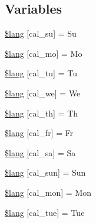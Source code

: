 \subsection*{Variables}
\begin{DoxyCompactItemize}
\item 
\mbox{\hyperlink{calendar__lang_8php_a2658243eff69e113a0e04a5b99e460c5}{\$lang}} \mbox{[}\textquotesingle{}cal\+\_\+su\textquotesingle{}\mbox{]} = \textquotesingle{}Su\textquotesingle{}
\item 
\mbox{\hyperlink{calendar__lang_8php_a1f9e709a44afce9a57157e6690fea106}{\$lang}} \mbox{[}\textquotesingle{}cal\+\_\+mo\textquotesingle{}\mbox{]} = \textquotesingle{}Mo\textquotesingle{}
\item 
\mbox{\hyperlink{calendar__lang_8php_a5c6f65fa28ce0cfba854143b7d6791a6}{\$lang}} \mbox{[}\textquotesingle{}cal\+\_\+tu\textquotesingle{}\mbox{]} = \textquotesingle{}Tu\textquotesingle{}
\item 
\mbox{\hyperlink{calendar__lang_8php_a665558e7ced8856da101496aae070447}{\$lang}} \mbox{[}\textquotesingle{}cal\+\_\+we\textquotesingle{}\mbox{]} = \textquotesingle{}We\textquotesingle{}
\item 
\mbox{\hyperlink{calendar__lang_8php_ae0e6a6298990150a03c6b6ac865c0b8e}{\$lang}} \mbox{[}\textquotesingle{}cal\+\_\+th\textquotesingle{}\mbox{]} = \textquotesingle{}Th\textquotesingle{}
\item 
\mbox{\hyperlink{calendar__lang_8php_a768a3d350ee6be1c25bf941e59875d7e}{\$lang}} \mbox{[}\textquotesingle{}cal\+\_\+fr\textquotesingle{}\mbox{]} = \textquotesingle{}Fr\textquotesingle{}
\item 
\mbox{\hyperlink{calendar__lang_8php_ac4d361c0c9626a2c82f8c6c28dcaebfc}{\$lang}} \mbox{[}\textquotesingle{}cal\+\_\+sa\textquotesingle{}\mbox{]} = \textquotesingle{}Sa\textquotesingle{}
\item 
\mbox{\hyperlink{calendar__lang_8php_aa5c527a9a5d3fb2ac58845a5d3bc95f4}{\$lang}} \mbox{[}\textquotesingle{}cal\+\_\+sun\textquotesingle{}\mbox{]} = \textquotesingle{}Sun\textquotesingle{}
\item 
\mbox{\hyperlink{calendar__lang_8php_acc316d0fc12362ea0e8ca331d865a7e5}{\$lang}} \mbox{[}\textquotesingle{}cal\+\_\+mon\textquotesingle{}\mbox{]} = \textquotesingle{}Mon\textquotesingle{}
\item 
\mbox{\hyperlink{calendar__lang_8php_a647c087563610b574e226fef9e825ee1}{\$lang}} \mbox{[}\textquotesingle{}cal\+\_\+tue\textquotesingle{}\mbox{]} = \textquotesingle{}Tue\textquotesingle{}
\item 

\end{DoxyCompactItemize}
